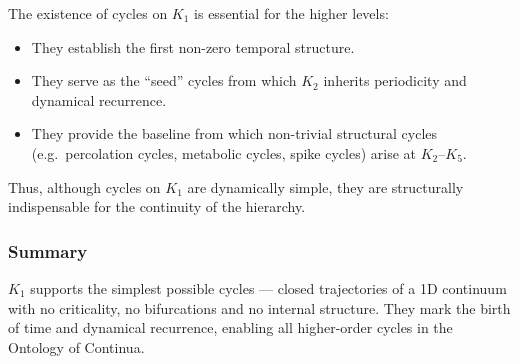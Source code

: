 The existence of cycles on $K_1$ is essential for the higher levels:

\begin{itemize}
  \item They establish the first non-zero temporal structure.
  \item They serve as the ``seed'' cycles from which $K_2$
        inherits periodicity and dynamical recurrence.
  \item They provide the baseline from which non-trivial structural
        cycles (e.g.\ percolation cycles, metabolic cycles, spike
        cycles) arise at $K_2$–$K_5$.
\end{itemize}

Thus, although cycles on $K_1$ are dynamically simple, they are
structurally indispensable for the continuity of the hierarchy.

\subsubsection{Summary}

$K_1$ supports the simplest possible cycles — closed trajectories of a
1D continuum with no criticality, no bifurcations and no internal
structure.
They mark the birth of time and dynamical recurrence, enabling all
higher-order cycles in the Ontology of Continua.
